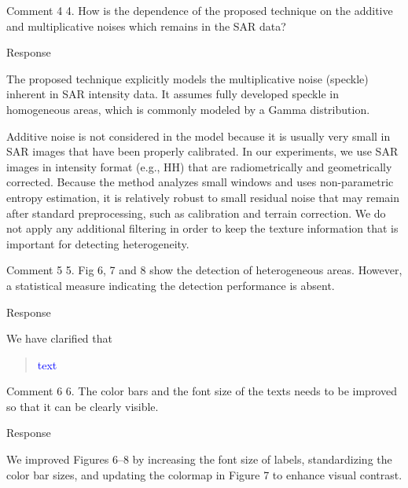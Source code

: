 \documentclass[11pt]{report}
\begin{document}
\vspace{2em}
\begin{reviewbox}{Comment 4}
4. How is the dependence of the proposed technique on the additive and multiplicative noises which remains in the SAR data?
\end{reviewbox}
\begin{responsebox}{Response}


The proposed technique explicitly models the multiplicative noise (speckle) inherent in SAR intensity data. It assumes fully developed speckle in homogeneous areas, which is commonly modeled by a Gamma distribution. 

Additive noise is not considered in the model because it is usually very small in SAR images that have been properly calibrated. In our experiments, we use SAR images in intensity format (e.g., HH) that are radiometrically and geometrically corrected. 
Because the method analyzes small windows and uses non-parametric entropy estimation, it is relatively robust to small residual noise that may remain after standard preprocessing, such as calibration and terrain correction. 
We do not apply any additional filtering in order to keep the texture information that is important for detecting heterogeneity.


\end{responsebox}

\vspace{2em}
\begin{reviewbox}{Comment 5}
5. Fig 6, 7 and 8 show the detection of heterogeneous areas. However, a statistical measure indicating the detection performance is absent.
\end{reviewbox}
\begin{responsebox}{Response}


We have clarified  that
\begin{quote}
	\textcolor{blue}{text}
\end{quote}
\end{responsebox}

\vspace{2em}
\begin{reviewbox}{Comment 6}
6. The color bars and the font size of the texts needs to be improved so that it can be clearly visible.
\end{reviewbox}
\begin{responsebox}{Response}

We improved Figures 6–8 by increasing the font size of labels, standardizing the color bar sizes, and updating the colormap in Figure 7 to enhance visual contrast.

	

\end{responsebox}
\end{document}

